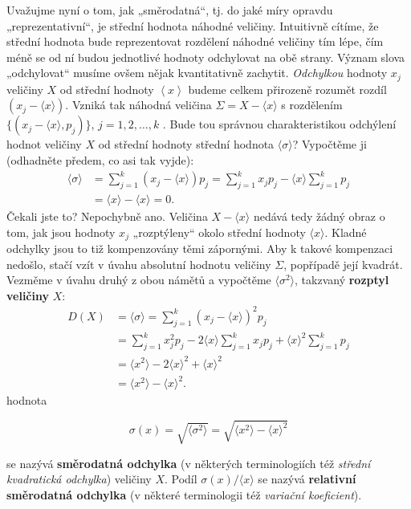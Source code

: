     Uvažujme nyní o tom, jak „směrodatná“, tj. do jaké míry opravdu „reprezentativní“, je
    střední hodnota náhodné veličiny. Intuitivně cítíme, že střední hodnota bude reprezentovat
    rozdělení náhodné veličiny tím lépe, čím méně se od ní budou jednotlivé hodnoty odchylovat na 
    obě strany. Význam slova „odchylovat“ musíme ovšem nějak kvantitativně zachytit.
    \emph{Odchylkou} hodnoty \(x_j\) veličiny \(X\) od střední hodnoty \(\left\langle x 
    \right\rangle\) budeme celkem přirozeně rozumět rozdíl \((x_j - \langle x\rangle)\). Vzniká tak 
    náhodná veličina \(\Sigma = X - \langle x \rangle\) s rozdělením \(\{(x_j - \langle x\rangle, 
    p_j)\}\), \(j = 1, 2, \ldots, k\) . Bude tou správnou charakteristikou odchýlení hodnot 
    veličiny \(X\) od střední hodnoty střední hodnota \(\langle\sigma\rangle\)? Vypočtěme ji 
    (odhadněte předem, co asi tak vyjde):
    \begin{align*}
      \langle\sigma\rangle 
          &= \sum_{j=1}^{k}(x_j - \langle x\rangle)p_j
           = \sum_{j=1}^{k}x_jp_j - \langle x\rangle\sum_{j=1}^{k}p_j   \\
          &= \langle x\rangle - \langle x\rangle = 0.
    \end{align*}
    Čekali jste to? Nepochybně ano. Veličina \(X - \langle x\rangle\) nedává tedy žádný obraz o 
    tom, jak jsou hodnoty \(x_j\) „rozptýleny“ okolo střední hodnoty \(\langle x\rangle\). Kladné 
    odchylky jsou to tiž kompenzovány těmi zápornými. Aby k takové kompenzaci nedošlo, stačí vzít 
    v úvahu absolutní hodnotu veličiny \(\Sigma\), popřípadě její kvadrát. Vezměme v úvahu druhý z 
    obou námětů a vypočtěme \(\langle \sigma^2\rangle\), takzvaný \textbf{rozptyl veličiny} \(X\):
    \begin{align}\label{mai:eq061}
       D(X) &= \langle \sigma\rangle = \sum_{j=1}^{k}(x_j - \langle x\rangle)^2p_j    \nonumber \\
            &= \sum_{j=1}^{k}x_j^2p_j - 2\langle x\rangle\sum_{j=1}^{k}x_jp_j 
              + \langle x\rangle^2\sum_{j=1}^{k}p_j                                   \nonumber \\
            &= \langle x^2\rangle - 2\langle x\rangle^2 + \langle x\rangle^2          \nonumber \\
            &= \langle x^2\rangle - \langle x\rangle^2.
    \end{align}
    hodnota
    \begin{mdframed}[style=highlight]
      \begin{equation}\label{mai:eq062}
        \sigma(x) = \sqrt{\langle \sigma^2\rangle} = \sqrt{\langle x^2\rangle - \langle x\rangle^2}
      \end{equation}
    \end{mdframed}
    se nazývá \textbf{směrodatná odchylka} (v některých terminologiích též \emph{střední 
    kvadratická odchylka}) veličiny \(X\). Podíl \(\sigma(x)/ \langle x\rangle\) se nazývá 
    \textbf{relativní směrodatná odchylka} (v některé terminologii též \emph{variační koeficient}).


